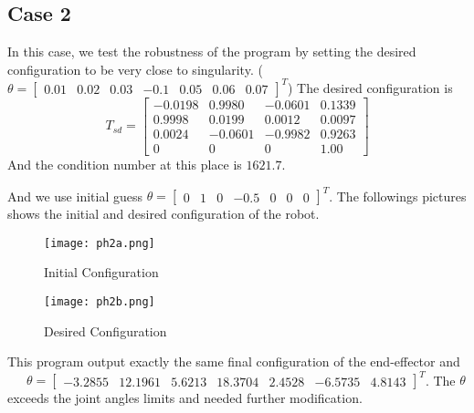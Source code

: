 \documentclass[english,10pt,a4paper]{article}
\begin{document}
    \subsection*{Case 2}
    In this case, we test the robustness of the program by setting the desired configuration to be very close to singularity. (\(\theta = \begin{bmatrix}
        0.01 & 0.02 & 0.03 & -0.1 & 0.05 & 0.06 & 0.07 \end{bmatrix}^T\)) The desired configuration is
    \begin{equation}
        T_{sd} = \begin{bmatrix}
            -0.0198 & 0.9980 & -0.0601 & 0.1339\\
            0.9998 & 0.0199 & 0.0012 & 0.0097\\
            0.0024 & -0.0601 & -0.9982 & 0.9263\\
            0 & 0 & 0 & 1.00
        \end{bmatrix}
    \end{equation}
    And the condition number at this place is \(1621.7\).
    
    And we use initial guess \(\theta = \begin{bmatrix}
        0 & 1 & 0 & -0.5 & 0 & 0 & 0 \end{bmatrix}^T\). The followings pictures shows the initial and desired configuration of the robot.
    \begin{figure}[H]
        \centering
        \begin{minipage}{0.45\textwidth}
            \centering
            \texttt{[image: ph2a.png]} %
            \caption{Initial Configuration}
            \label{fig:ph2a}
        \end{minipage}
        \hfill
        \begin{minipage}{0.45\textwidth}
        \centering
            \texttt{[image: ph2b.png]} %
            \caption{Desired Configuration}
            \label{fig:ph2b}
        \end{minipage}
    \end{figure}
    This program output exactly the same final configuration of the end-effector and \ \ \ \(\theta = \begin{bmatrix} -3.2855 & 12.1961 & 5.6213 & 18.3704 & 2.4528 & -6.5735 & 4.8143 \end{bmatrix}^T\). The \(\theta\) exceeds the joint angles limits and needed further modification.
\end{document}
